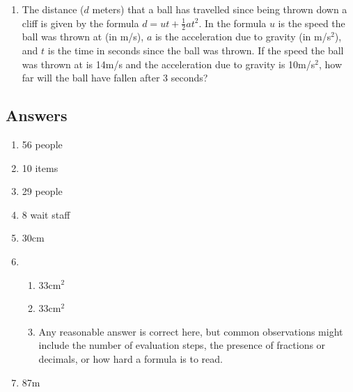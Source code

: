 \documentclass[a4paper,12pt]{article}
\begin{document}
\begin{enumerate}
\item The distance ($d$ meters) that a ball has travelled since being 
    thrown down a cliff is given by the formula 
    $d = ut + \frac{1}{2}at^2$. In the formula $u$ is the speed the 
    ball was thrown at (in m/s), $a$ is the acceleration due to gravity
    (in m/s$^2$), and $t$ is the time in seconds since the ball
    was thrown. If the speed the ball was thrown at is 14m/s and the
    acceleration due to gravity is 10m/s$^2$, how far will the 
    ball have fallen after 3 seconds?

\end{enumerate}

\newpage
\subsection*{Answers}

\begin{enumerate}
\item 56 people %

\item 10 items %

\item 29 people %

\item 8 wait staff %

\item 30cm %

\item %
    \begin{enumerate}
    \item 33cm$^2$
    \item 33cm$^2$
    \item Any reasonable answer is correct here, but common 
        observations might include the number of evaluation steps, 
        the presence of fractions or decimals, or how hard a 
        formula is to read.
    \end{enumerate}

\item 87m %
\end{enumerate}
\end{document}
